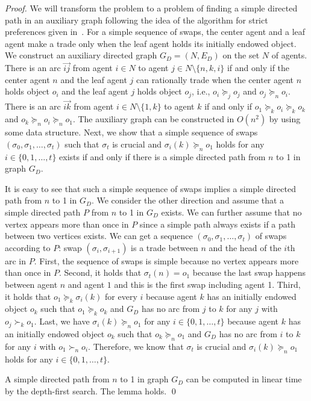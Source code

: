 \begin{proof}
We will transform the problem to a problem of finding a simple directed path in an auxiliary graph following the idea of the algorithm for strict preferences given in~\citep{DBLP:conf/ijcai/GourvesLW17}.
For a simple sequence of swaps, the center agent and a leaf agent make a trade only when the leaf agent holds its initially endowed object.
We construct an auxiliary directed graph $G_D=(N,E_D)$ on the set $N$ of agents.
There is an arc $\overrightarrow{ij}$ from  agent $i\in N$ to agent $j\in N\setminus\{n,k,i\}$ if and only if
the center agent $n$ and the leaf agent $j$ can rationally trade when the center agent $n$ holds object $o_i$ and the leaf agent $j$ holds object $o_j$,
i.e., $o_i\succeq_j o_j$ and $o_j\succeq_n o_i$.
There is an arc $\overrightarrow{ik}$ from  agent $i\in N\setminus\{1,k\}$ to agent $k$ if and only if
$o_1\succeq_k o_i\succeq_k o_k$ and $o_k\succeq_n o_i \succeq_n o_1$.
The auxiliary graph can be constructed in $O(n^2)$ by using some data structure.
Next, we show that a simple sequence of swaps $(\sigma_0,\sigma_1,\dots,\sigma_t)$ such that $\sigma_t$ is crucial and $\sigma_i(k)\succeq_n o_1$ holds for any $i\in \{0,1,\dots, t\}$ exists if
and only if there is a simple directed path from $n$ to 1 in graph $G_D$.

It is easy to see that such a simple sequence of swaps implies a simple directed path from $n$ to 1 in $G_D$.
We consider the other direction and assume that a simple directed path $P$ from $n$ to 1 in $G_D$ exists. We can further assume that no vertex appears more than once in $P$ since a simple path always exists if a path between two vertices exists. We can get a sequence $(\sigma_0,\sigma_1,\dots,\sigma_t)$ of swaps according to $P$:
swap $(\sigma_i,\sigma_{i+1})$ is a trade between $n$ and the head of the $i$th arc in $P$.
First, the sequence of swaps is simple because no vertex appears more than once in $P$.
Second, it holds that $\sigma_t(n)=o_1$ because the last swap happens between agent $n$ and agent $1$ and this is the first swap including agent 1.
Third, it holds that $o_1\succeq_k \sigma_i(k)$ for every $i$ because agent $k$ has an initially endowed object $o_k$ such that $o_1 \succeq_k o_k$ and $G_D$ has no arc from $j$ to $k$ for any $j$ with $o_j \succ_k o_1$.
Last, we have $\sigma_i(k)\succeq_n o_1$ for any $i\in \{0,1,\dots, t\}$ because agent $k$ has an initially endowed object $o_k$ such that  $o_k \succeq_n o_1$ and $G_D$ has no arc from $i$ to $k$ for any $i$ with $o_1 \succ_n o_i$.
Therefore, we know that $\sigma_t$ is crucial and $\sigma_i(k)\succeq_n o_1$ holds for any $i\in \{0,1,\dots, t\}$.

A simple directed path from $n$ to 1 in graph $G_D$ can be computed in linear time by the depth-first search. The lemma holds.
\qed
\end{proof}


